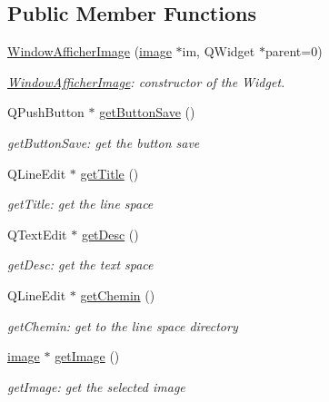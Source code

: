 \subsection*{Public Member Functions}
\begin{DoxyCompactItemize}
\item 
\hyperlink{class_window_afficher_image_a98a5ee55c190ac82b232248fb1ebde16}{Window\+Afficher\+Image} (\hyperlink{classimage}{image} $\ast$im, Q\+Widget $\ast$parent=0)
\begin{DoxyCompactList}\small\item\em \hyperlink{class_window_afficher_image}{Window\+Afficher\+Image}\+: constructor of the Widget. \end{DoxyCompactList}\item 
Q\+Push\+Button $\ast$ \hyperlink{class_window_afficher_image_ab4d02c68e2c3ae753e7547b114e5bbb3}{get\+Button\+Save} ()
\begin{DoxyCompactList}\small\item\em get\+Button\+Save\+: get the button save \end{DoxyCompactList}\item 
Q\+Line\+Edit $\ast$ \hyperlink{class_window_afficher_image_a2af473bca8e2be4e6aaadaa92b7da192}{get\+Title} ()
\begin{DoxyCompactList}\small\item\em get\+Title\+: get the line space \end{DoxyCompactList}\item 
Q\+Text\+Edit $\ast$ \hyperlink{class_window_afficher_image_a0abeb04216548502d7026bad0c00d0f4}{get\+Desc} ()
\begin{DoxyCompactList}\small\item\em get\+Desc\+: get the text space \end{DoxyCompactList}\item 
Q\+Line\+Edit $\ast$ \hyperlink{class_window_afficher_image_a59e27e3dbd1f2bc4a0d9fe99a20025fb}{get\+Chemin} ()
\begin{DoxyCompactList}\small\item\em get\+Chemin\+: get to the line space directory \end{DoxyCompactList}\item 
\hyperlink{classimage}{image} $\ast$ \hyperlink{class_window_afficher_image_ac8a0d10bb80e99fda8ca7eaf77b072ea}{get\+Image} ()
\begin{DoxyCompactList}\small\item\em get\+Image\+: get the selected image \end{DoxyCompactList}\end{DoxyCompactItemize}


